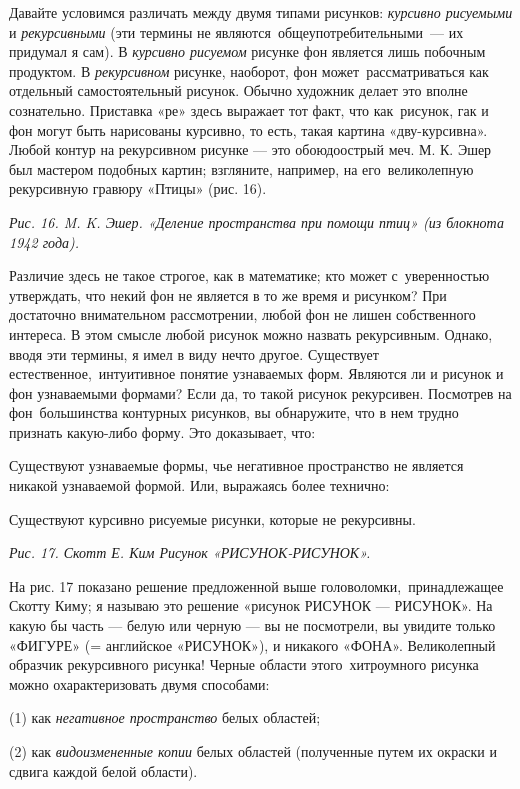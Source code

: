 Давайте условимся различать между двумя типами рисунков: \emph{курсивно рисуемыми} и \emph{рекурсивными} (эти термины не являются~общеупотребительными~--- их придумал я сам). В \emph{курсивно рисуемом} рисунке фон является лишь побочным продуктом. В \emph{рекурсивном} рисунке, наоборот, фон может~рассматриваться как отдельный самостоятельный рисунок. Обычно художник делает это вполне сознательно. Приставка «ре» здесь выражает тот факт, что как~рисунок, гак и фон могут быть нарисованы курсивно, то есть, такая картина «дву-курсивна». Любой контур на рекурсивном рисунке --- это обоюдоострый меч. М. К. Эшер был мастером подобных картин; взгляните, например, на его~великолепную рекурсивную гравюру «Птицы» (рис. 16).

\emph{Рис. 16. M. K. Эшер. «Деление пространства при помощи птиц» (из блокнота 1942 года).}

Различие здесь не такое строгое, как в математике; кто может с~уверенностью утверждать, что некий фон не является в то же время и рисунком? При достаточно внимательном рассмотрении, любой фон не лишен собственного интереса. В этом смысле любой рисунок можно назвать рекурсивным. Однако, вводя эти термины, я имел в виду нечто другое. Существует естественное,~интуитивное понятие узнаваемых форм. Являются ли и рисунок и фон узнаваемыми формами? Если да, то такой рисунок рекурсивен. Посмотрев на фон~большинства контурных рисунков, вы обнаружите, что в нем трудно признать какую-либо форму. Это доказывает, что:

Существуют узнаваемые формы, чье негативное пространство не является никакой узнаваемой формой. Или, выражаясь более технично:

Существуют курсивно рисуемые рисунки, которые не рекурсивны.

\emph{Рис. 17. Скотт Е. Ким Рисунок «РИСУНОК-РИСУНОК».}

На рис. 17 показано решение предложенной выше головоломки,~принадлежащее Скотту Киму; я называю это решение «рисунок РИСУНОК --- РИСУНОК». На какую бы часть --- белую или черную --- вы не посмотрели, вы увидите только «ФИГУРЕ» (= английское «РИСУНОК»), и никакого «ФОНА». Великолепный образчик рекурсивного рисунка! Черные области этого~хитроумного рисунка можно охарактеризовать двумя способами:

(1) как \emph{негативное пространство} белых областей;

(2) как \emph{видоизмененные копии} белых областей (полученные путем их окраски и сдвига каждой белой области).

